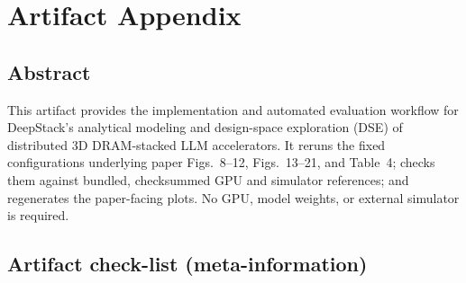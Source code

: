 \documentclass[10pt,twocolumn]{article}
\begin{document}
\appendix
\section{Artifact Appendix}

\subsection{Abstract}

This artifact provides the implementation and automated evaluation workflow
for DeepStack's analytical modeling and design-space exploration (DSE) of
distributed 3D DRAM-stacked LLM accelerators. It reruns the fixed
configurations underlying paper Figs.~8--12, Figs.~13--21, and Table~4; checks
them against bundled, checksummed GPU and simulator references; and
regenerates the paper-facing plots. No GPU, model weights, or external
simulator is required.

\subsection{Artifact check-list (meta-information)}
\end{document}
